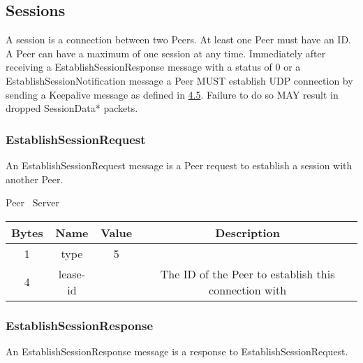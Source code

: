 \subsection{Sessions}

A session is a connection between two Peers. At least one Peer must have an ID. A Peer can have a maximum of one
session at any time. Immediately after receiving a EstablishSessionResponse message with a status
of 0 or a EstablishSessionNotification message a Peer MUST establish UDP connection by sending a
Keepalive message as defined in \hyperlink{subsection.4.5}{4.5}. Failure to do so MAY result in dropped
SessionData* packets.

\subsubsection{EstablishSessionRequest}

An EstablishSessionRequest message is a Peer request to establish a session with another Peer.

\begin{center}
    Peer \textrightarrow\ Server\\
    \begin{tabular}{|c|c|c|c|}
        \hline
        \textbf{Bytes} & \textbf{Name} & \textbf{Value} & \textbf{Description}                                 \\
        \hline
        1              & type          & 5              &                                                      \\
        \hline
        4              & lease-id      &                & The ID of the Peer to establish this connection with \\
        \hline
    \end{tabular}
\end{center}

\subsubsection{EstablishSessionResponse}

An EstablishSessionResponse message is a response to EstablishSessionRequest.


